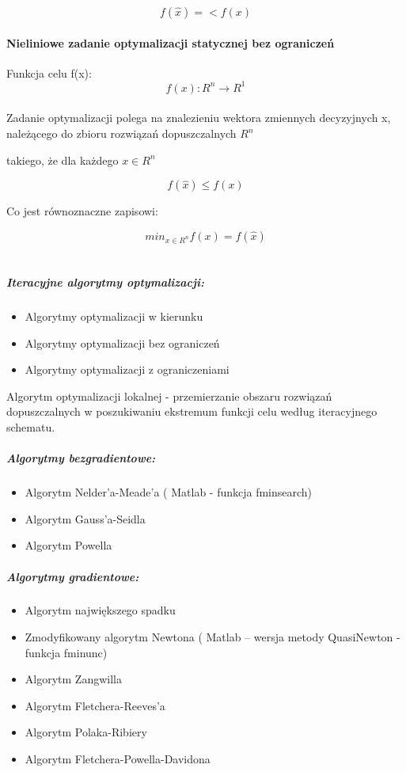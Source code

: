 \documentclass[]{report}
\begin{document}
$$f(\hat{x})=<f(x)$$


\paragraph{Nieliniowe zadanie optymalizacji statycznej bez ograniczeń}


Funkcja celu f(x):
$$f(x):R^n \longrightarrow R^1$$
\\
Zadanie optymalizacji polega na znalezieniu wektora zmiennych decyzyjnych x, należącego do zbioru rozwiązań dopuszczalnych $R^n$

takiego, że dla każdego $ x \in R^n $


$$ f(\hat{x})\le f(x) $$

Co jest równoznaczne zapisowi:

$$min_{x \in R^n} f(x) = f(\hat{x})$$
\\
\subparagraph{Iteracyjne algorytmy optymalizacji:}
\begin{itemize}
\item Algorytmy optymalizacji w kierunku
\item Algorytmy optymalizacji bez ograniczeń
\item Algorytmy optymalizacji z ograniczeniami
\end{itemize}
Algorytm optymalizacji lokalnej - przemierzanie obszaru rozwiązań dopuszczalnych w poszukiwaniu ekstremum funkcji celu według iteracyjnego schematu.

\subparagraph{Algorytmy bezgradientowe:}
\begin{itemize}
\item Algorytm Nelder’a-Meade’a ( Matlab - funkcja fminsearch)
\item Algorytm Gauss’a-Seidla
\item Algorytm Powella 
\end{itemize}

\subparagraph{Algorytmy gradientowe:}
\begin{itemize}
\item Algorytm największego spadku
\item Zmodyfikowany algorytm Newtona ( Matlab – wersja metody QuasiNewton
- funkcja fminunc)
\item Algorytm Zangwilla
\item Algorytm Fletchera-Reeves’a
\item Algorytm Polaka-Ribiery
\item Algorytm Fletchera-Powella-Davidona
\end{itemize}
\end{document}
